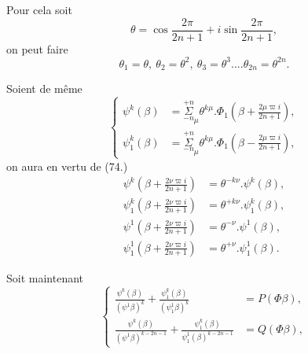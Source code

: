 \documentclass{article}
\begin{document}
Pour cela soit
\[ \theta=\cos\frac{2\pi}{2n+1}+i\sin\frac{2\pi}{2n+1}, \]
on peut faire
\[ \theta_{1}=\theta,\ \theta_{2}=\theta^{2},\ \theta_{3}=\theta^{3}....\theta_{2n}=\theta^{2n}. \]

Soient de même
\[ \left\{\begin{aligned}
\psi^{k}(\beta)&=\overset{+n}{\underset{-n}{\Sigma}}_{\mu}\theta^{k\mu}.\Phi_{1}\left(\beta+\frac{2\mu\varpi i}{2n+1}\right),\\
\psi_{1}^{k}(\beta)&=\overset{+n}{\underset{-n}{\Sigma}}_{\mu}\theta^{k\mu}.\Phi_{1}\left(\beta-\frac{2\mu\varpi i}{2n+1}\right),
\end{aligned}\right. \tag{85.} \]
on aura en vertu de (74.)
\[ \begin{aligned}
\psi^{k}\left(\beta+\frac{2\nu\varpi i}{2n+1}\right)&=\theta^{-k\nu}.\psi^{k}(\beta),\\
\psi_{1}^{k}\left(\beta+\frac{2\nu\varpi i}{2n+1}\right)&=\theta^{+k\nu}.\psi_{1}^{k}(\beta),\\
\psi^{1}\left(\beta+\frac{2\nu\varpi i}{2n+1}\right)&=\theta^{-\nu}.\psi^{1}(\beta),\\
\psi_{1}^{1}\left(\beta+\frac{2\nu\varpi i}{2n+1}\right)&=\theta^{+\nu}.\psi_{1}^{1}(\beta).
\end{aligned} \]

Soit maintenant
\[ \left\{\begin{aligned}
\frac{\psi^{k}(\beta)}{(\psi^{1}\beta)^{k}}+\frac{\psi_{1}^{k}(\beta)}{(\psi_{1}^{1}\beta)^{k}}&=P(\Phi\beta),\\
\frac{\psi^{k}(\beta)}{(\psi^{1}\beta)^{k-2n-1}}+\frac{\psi_{1}^{k}(\beta)}{\psi_{1}^{1}(\beta)^{k-2n-1}}&=Q(\Phi\beta),
\end{aligned}\right. \tag{86.} \]
\end{document}
